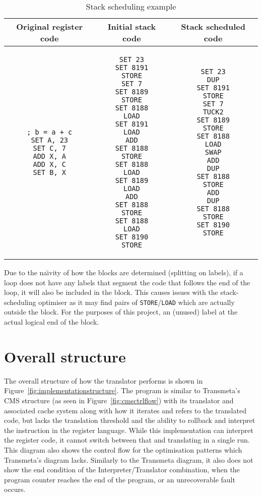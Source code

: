 \begin{table}
\caption{Stack scheduling example}
\begin{tabular}{c c c}\label{tab:scheduleex}
Original register code & Initial stack code & Stack scheduled code \\ \toprule
\begin{lstlisting}
; b = a + c
SET A, 23
SET C, 7
ADD X, A
ADD X, C
SET B, X
\end{lstlisting} &
\begin{lstlisting}
SET 23
SET 8191
STORE
SET 7
SET 8189
STORE
SET 8188
LOAD
SET 8191
LOAD
ADD
SET 8188
STORE
SET 8188
LOAD
SET 8189
LOAD
ADD
SET 8188
STORE
SET 8188
LOAD
SET 8190
STORE
\end{lstlisting} &
\begin{lstlisting}
SET 23
DUP
SET 8191
STORE
SET 7
TUCK2
SET 8189
STORE
SET 8188
LOAD
SWAP
ADD
DUP
SET 8188
STORE
ADD
DUP
SET 8188
STORE
SET 8190
STORE
\end{lstlisting} \\
\end{tabular}
\end{table}

Due to the na{\"\i}vity of how the blocks are determined (splitting on labels),
if a loop does not have any labels that segment the code that follows the end of
the loop, it will also be included in the block.  This causes issues with the
stack-scheduling optimiser as it may find pairs of \texttt{STORE}/\texttt{LOAD}
which are actually outside the block. For the purposes of this project, an
(unused) label at the actual logical end of the block.

\section{Overall structure}
The overall structure of how the translator performs is shown in
Figure~\ref{fig:implementationstructure}. The program is similar to Transmeta's
CMS structure (as seen in Figure~\ref{fig:cmsctrlflow}) with its translator and
associated cache system along with how it iterates and refers to the translated
code, but lacks the translation threshold and the ability to rollback and
interpret the instruction in the register language. While this implementation
can interpret the register code, it cannot switch between that and translating
in a single run. This diagram also shows the control flow for the optimisation
patterns which Transmeta's diagram lacks. Similarly to the Transmeta diagram, it
also does not show the end condition of the Interpreter/Translator combination,
when the program counter reaches the end of the program, or an unrecoverable
fault occurs.

